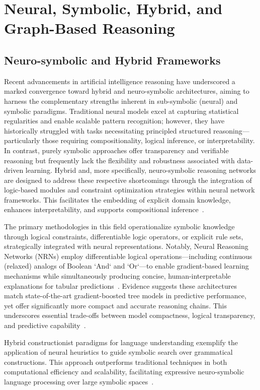 \section{Neural, Symbolic, Hybrid, and Graph-Based Reasoning}

\subsection{Neuro-symbolic and Hybrid Frameworks}

Recent advancements in artificial intelligence reasoning have underscored a marked convergence toward hybrid and neuro-symbolic architectures, aiming to harness the complementary strengths inherent in sub-symbolic (neural) and symbolic paradigms. Traditional neural models excel at capturing statistical regularities and enable scalable pattern recognition; however, they have historically struggled with tasks necessitating principled structured reasoning—particularly those requiring compositionality, logical inference, or interpretability. In contrast, purely symbolic approaches offer transparency and verifiable reasoning but frequently lack the flexibility and robustness associated with data-driven learning. Hybrid and, more specifically, neuro-symbolic reasoning networks are designed to address these respective shortcomings through the integration of logic-based modules and constraint optimization strategies within neural network frameworks. This facilitates the embedding of explicit domain knowledge, enhances interpretability, and supports compositional inference~\cite{ref93,ref1,ref10,ref11,ref22,ref42,ref45,ref49,ref54,ref56,ref68,ref86}.

The primary methodologies in this field operationalize symbolic knowledge through logical constraints, differentiable logic operators, or explicit rule sets, strategically integrated with neural representations. Notably, Neural Reasoning Networks (NRNs) employ differentiable logical operations—including continuous (relaxed) analogs of Boolean `And` and `Or`—to enable gradient-based learning mechanisms while simultaneously producing concise, human-interpretable explanations for tabular predictions~\cite{ref93}. Evidence suggests these architectures match state-of-the-art gradient-boosted tree models in predictive performance, yet offer significantly more compact and accurate reasoning chains. This underscores essential trade-offs between model compactness, logical transparency, and predictive capability~\cite{ref93,ref49}.

Hybrid constructionist paradigms for language understanding exemplify the application of neural heuristics to guide symbolic search over grammatical constructions. This approach outperforms traditional techniques in both computational efficiency and scalability, facilitating expressive neuro-symbolic language processing over large symbolic spaces~\cite{ref54}.

